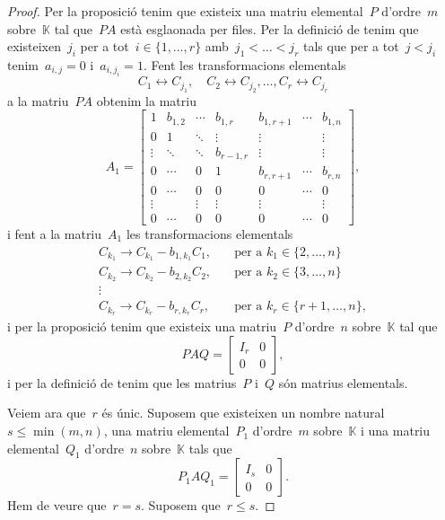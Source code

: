 \documentclass[../../main.tex]{subfiles}
\begin{document}
\begin{theorem}
\begin{proof}
			Per la proposició  tenim que existeix una matriu elemental~\(P\) d'ordre~\(m\) sobre~\(\mathbb{K}\) tal que~\(PA\) està esglaonada per files.
			Per la definició de  tenim que existeixen~\(j_{i}\) per a tot~\(i\in\{1,\dots,r\}\) amb~\(j_{1}<\dots<j_{r}\) tals que per a tot~\(j<j_{i}\) tenim~\(a_{i,j}=0\) i~\(a_{i,j_{i}}=1\).
			Fent les transformacions elementals
			\[
			    C_{1}\leftrightarrow C_{j_{1}},\quad C_{2}\leftrightarrow C_{j_{2}},\dots,C_{r}\leftrightarrow C_{j_{r}}
			\]
			a la matriu~\(PA\) obtenim la matriu
			\[A_{1}=\left[\begin{array}{cccc|ccc}
			1 & b_{1,2} & \cdots & b_{1,r} & b_{1,r+1} & \cdots & b_{1,n} \\
			0 & 1 & \ddots & \vdots & \vdots & & \vdots\\
			\vdots & \ddots & \ddots & b_{r-1,r} & \vdots & & \vdots \\
			0 & \cdots & 0 & 1 & b_{r,r+1} & \cdots & b_{r,n} \\\hline
			0 & \cdots & 0 & 0 & 0 & \cdots & 0 \\
			\vdots & & \vdots & \vdots & \vdots & & \vdots \\
			0 & \cdots & 0 & 0 & 0 & \cdots & 0
			\end{array}\right],\]
			i fent a la matriu~\(A_{1}\) les transformacions elementals
			\begin{align*}
			C_{k_{1}}\rightarrow C_{k_{1}}-b_{1,k_{1}}C_{1},\quad&\text{per a }k_{1}\in\{2,\dots,n\} \\
			C_{k_{2}}\rightarrow C_{k_{2}}-b_{2,k_{2}}C_{2},\quad&\text{per a }k_{2}\in\{3,\dots,n\} \\
			\vdots & \\
			C_{k_{r}}\rightarrow C_{k_{r}}-b_{r,k_{r}}C_{r},\quad&\text{per a }k_{r}\in\{r+1,\dots,n\},
			\end{align*}
			i per la proposició  tenim que existeix una matriu~\(P\) d'ordre~\(n\) sobre~\(\mathbb{K}\) tal que
			\[PAQ=\left[\begin{array}{c|c}
			I_{r} & 0\\\hline
			0 & 0
			\end{array}\right],\]
			i per la definició de  tenim que les matrius~\(P\) i~\(Q\) són matrius elementals.

			Veiem ara que~\(r\) és únic.
			Suposem que existeixen un nombre natural~\(s\leq\min(m,n)\), una matriu elemental~\(P_{1}\) d'ordre~\(m\) sobre~\(\mathbb{K}\) i una matriu elemental~\(Q_{1}\) d'ordre~\(n\) sobre~\(\mathbb{K}\) tals que
			\[P_{1}AQ_{1}=\left[\begin{array}{c|c}
			I_{s} & 0\\\hline
			0 & 0
			\end{array}\right].\]
			Hem de veure que~\(r=s\).
			Suposem que~\(r\leq s\).


\end{proof}
\end{theorem}
\end{document}
